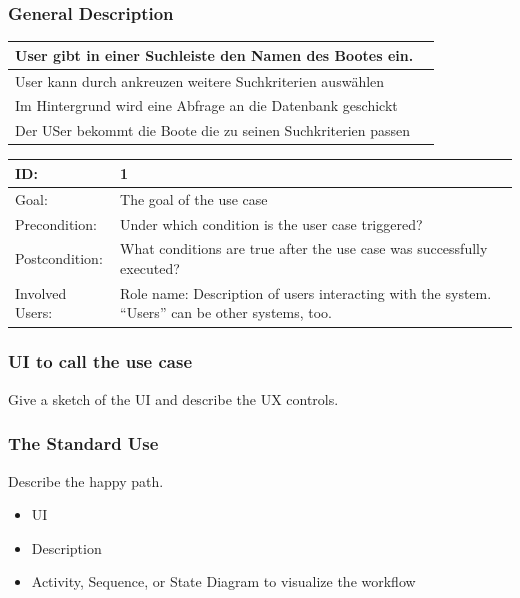 \documentclass[12pt]{article}
\theoremstyle{definition}
\newenvironment{explanation}{%
   \setlength{\parindent}{0pt}
   \itshape
   \color{blue}
}{}
\begin{document}
\subsubsection{General Description}
\begin{tabular}{|p{.2\linewidth}|p{.65\linewidth}|}
	User gibt in einer Suchleiste den Namen des Bootes ein. \\ \hline
	User kann durch ankreuzen weitere Suchkriterien auswählen \\ \hline
	Im Hintergrund wird eine Abfrage an die Datenbank geschickt \\ \hline
	Der USer bekommt die Boote die zu seinen Suchkriterien passen \\ \hline
\end{tabular}

\begin{tabular}{|p{.2\linewidth}|p{.65\linewidth}|}
\hline 
ID: & 1 \\ \hline
Goal: & The goal of the use case \\ \hline
Precondition: & Under which condition is the user case triggered? \\ \hline
Postcondition: & What conditions are true after the use case was successfully executed? \\ \hline
Involved Users: &Role name: Description of users interacting with the system. “Users” can be other systems, too. \\ \hline
\end{tabular}

\subsubsection{UI to call the use case}
\begin{explanation}
Give a sketch of the UI and describe the UX controls.
\end{explanation}

\subsubsection{The Standard Use}
\begin{explanation}
Describe the happy path.
\begin{itemize}
	\item UI
	\item Description
	\item Activity, Sequence, or State Diagram to visualize the workflow
\end{itemize}
\end{explanation}
\end{document}
